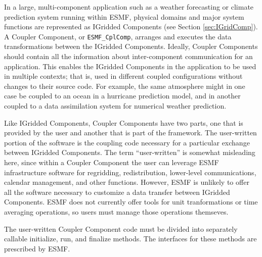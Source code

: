 %

\label{sec:CplComp}

In a large, multi-component application such as a weather 
forecasting or climate prediction system running within ESMF, 
physical domains and major system functions are represented 
as IGridded Components 
(see Section \ref{sec:IGridComp}).  A Coupler Component, or 
{\tt ESMF\_CplComp}, arranges and executes the data 
transformations between the IGridded Components.  Ideally, 
Coupler Components should contain all the information 
about inter-component communication for an application.
This enables the IGridded Components in the application to be 
used in multiple contexts; that is, used in different coupled 
configurations without changes to their source code. 
For example, the same atmosphere might in one case be coupled 
to an ocean in a hurricane prediction model, and in another
coupled to a data assimilation system for numerical weather 
prediction.

Like IGridded Components, Coupler Components have two parts, one
that is provided by the user and another that is part of the 
framework.  The user-written portion of the software is the coupling
code necessary for a particular exchange between IGridded Components.  
The term ``user-written'' is somewhat misleading here, since within 
a Coupler Component the user can leverage ESMF infrastructure 
software for regridding, redistribution, lower-level communications, 
calendar management, and other functions.  However, ESMF is unlikely 
to offer all the software necessary to customize a data transfer
between IGridded Components.  ESMF does not currently offer tools 
for unit tranformations or time averaging operations, so users 
must manage those operations themseves.

The user-written Coupler Component code must be divided into 
separately callable initialize, run, and finalize methods.  The 
interfaces for these methods are prescribed by ESMF.

